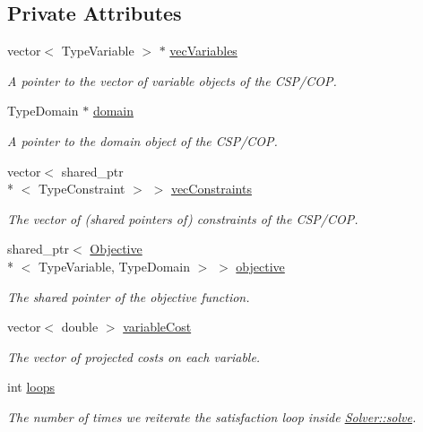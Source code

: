 \subsection*{Private Attributes}
\begin{DoxyCompactItemize}
\item 
vector$<$ Type\-Variable $>$ $\ast$ \hyperlink{classghost_1_1Solver_a2d033a454234b2277aabdcc4d89eaba2}{vec\-Variables}
\begin{DoxyCompactList}\small\item\em A pointer to the vector of variable objects of the C\-S\-P/\-C\-O\-P. \end{DoxyCompactList}\item 
Type\-Domain $\ast$ \hyperlink{classghost_1_1Solver_ad9292e9219261ba8058fec05b453c0c9}{domain}
\begin{DoxyCompactList}\small\item\em A pointer to the domain object of the C\-S\-P/\-C\-O\-P. \end{DoxyCompactList}\item 
vector$<$ shared\-\_\-ptr\\*
$<$ Type\-Constraint $>$ $>$ \hyperlink{classghost_1_1Solver_a170746edcfb777b12978444c2ab3962e}{vec\-Constraints}
\begin{DoxyCompactList}\small\item\em The vector of (shared pointers of) constraints of the C\-S\-P/\-C\-O\-P. \end{DoxyCompactList}\item 
shared\-\_\-ptr$<$ \hyperlink{classghost_1_1Objective}{Objective}\\*
$<$ Type\-Variable, Type\-Domain $>$ $>$ \hyperlink{classghost_1_1Solver_a4fd74bd68d0ea253fd35adad697f964d}{objective}
\begin{DoxyCompactList}\small\item\em The shared pointer of the objective function. \end{DoxyCompactList}\item 
vector$<$ double $>$ \hyperlink{classghost_1_1Solver_a76c1057367112ead0304b436b5f508f1}{variable\-Cost}
\begin{DoxyCompactList}\small\item\em The vector of projected costs on each variable. \end{DoxyCompactList}\item 
int \hyperlink{classghost_1_1Solver_aa6a77e14862a9be467e6c6c76124b526}{loops}
\begin{DoxyCompactList}\small\item\em The number of times we reiterate the satisfaction loop inside \hyperlink{classghost_1_1Solver_af025b99595aeff4fd9a174bcbd66a991}{Solver\-::solve}. \end{DoxyCompactList}\item 

\end{DoxyCompactItemize}
